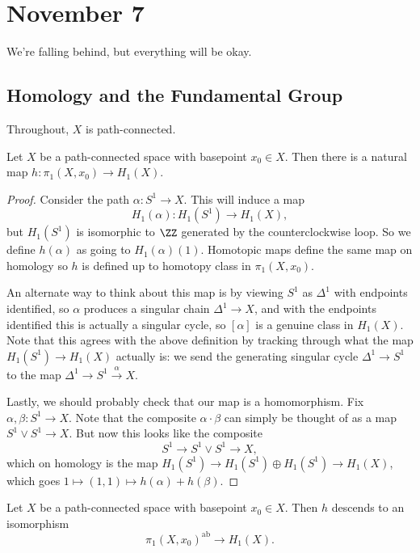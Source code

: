 \documentclass[../notes.tex]{subfiles}
\begin{document}
\section{November 7}

We're falling behind, but everything will be okay.

\subsection{Homology and the Fundamental Group}
Throughout, $X$ is path-connected.
\begin{proposition}[Hurewicz]
	Let $X$ be a path-connected space with basepoint $x_0\in X$. Then there is a natural map $h\colon\pi_1(X,x_0)\to H_1(X)$.
\end{proposition}
\begin{proof}
	Consider the path $\alpha\colon S^1\to X$. This will induce a map
	\[H_1(\alpha)\colon H_1\left(S^1\right)\to H_1(X),\]
	but $H_1\left(S^1\right)$ is isomorphic to $\ZZ$ generated by the counterclockwise loop. So we define $h(\alpha)$ as going to $H_1(\alpha)(1)$. Homotopic maps define the same map on homology so $h$ is defined up to homotopy class in $\pi_1(X,x_0)$.
	\begin{remark}
		An alternate way to think about this map is by viewing $S^1$ as $\Delta^1$ with endpoints identified, so $\alpha$ produces a singular chain $\Delta^1\to X$, and with the endpoints identified this is actually a singular cycle, so $[\alpha]$ is a genuine class in $H_1(X)$. Note that this agrees with the above definition by tracking through what the map $H_1\left(S^1\right)\to H_1(X)$ actually is: we send the generating singular cycle $\Delta^1\to S^1$ to the map $\Delta^1\to S^1\stackrel\alpha\to X$.
	\end{remark}
	Lastly, we should probably check that our map is a homomorphism. Fix $\alpha,\beta\colon S^1\to X$. Note that the composite $\alpha\cdot\beta$ can simply be thought of as a map $S^1\lor S^1\to X$. But now this looks like the composite
	\[S^1\to S^1\lor S^1\to X,\]
	which on homology is the map $H_1\left(S^1\right)\to H_1\left(S^1\right)\oplus H_1\left(S^1\right)\to H_1(X)$, which goes $1\mapsto(1,1)\mapsto h(\alpha)+h(\beta)$.
\end{proof}
\begin{theorem} \label{thm:pi1-ab}
	Let $X$ be a path-connected space with basepoint $x_0\in X$. Then $h$ descends to an isomorphism
	\[\pi_1(X,x_0)^{\mathrm{ab}}\to H_1(X).\]
\end{theorem}
\end{document}
